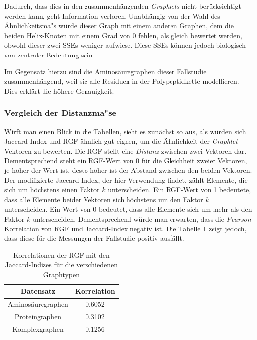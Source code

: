 \documentclass{report}
\begin{document}
Dadurch, dass dies in den zusammenh\"angenden \textit{Graphlets} nicht ber\"ucksichtigt werden kann, geht Information verloren. Unabh\"angig von der Wahl des \"Ahnlichkeitsma"s w\"urde dieser Graph mit einem anderen Graphen, dem die beiden Helix-Knoten mit einem Grad von 0 fehlen, als gleich bewertet werden, obwohl dieser zwei SSEs weniger aufwiese. Diese SSEs k\"onnen jedoch biologisch von zentraler Bedeutung sein.

Im Gegensatz hierzu sind die Aminos\"auregraphen dieser Fallstudie zusammenh\"angend, weil sie alle Residuen in der Polypeptidkette modellieren. Dies erkl\"art die h\"ohere Genauigkeit.


\subsubsection{Vergleich der Distanzma"se}

Wirft man einen Blick in die Tabellen, sieht es zun\"achst so aus, als w\"urden sich Jaccard-Index und RGF \"ahnlich gut eignen, um die \"Ahnlichkeit der \textit{Graphlet}-Vektoren zu bewerten. Die RGF stellt eine \emph{Distanz} zwischen zwei Vektoren dar. Dementsprechend steht ein RGF-Wert von 0 f\"ur die Gleichheit zweier Vektoren, je h\"oher der Wert ist, desto h\"oher ist der Abstand zwischen den beiden Vektoren. Der modifizierte Jaccard-Index, der hier Verwendung findet, z\"ahlt Elemente, die sich um h\"ochstens einen Faktor $k$ unterscheiden. Ein RGF-Wert von 1 bedeutete, dass alle Elemente beider Vektoren sich h\"ochstens um den Faktor $k$ unterscheiden. Ein Wert von 0 bedeutet, dass alle Elemente sich um mehr als den Faktor $k$ unterscheiden. Dementsprechend w\"urde man erwarten, dass die \textit{Pearson}-Korrelation von RGF und Jaccard-Index negativ ist. Die Tabelle \ref{tab:correlation} zeigt jedoch, dass diese f\"ur die Messungen der Fallstudie positiv ausf\"allt. 

\begin{table}
\begin{tabular}{ | c | c | }
\hline
Datensatz           & Korrelation \\ \hline
Aminos\"auregraphen &   0.6052    \\ \hline
Proteingraphen      &   0.3102    \\ \hline      
Komplexgraphen      &   0.1256    \\ \hline
\end{tabular}
\caption{Korrelationen der RGF mit den Jaccard-Indizes f\"ur die verschiedenen Graphtypen}
\label{tab:correlation}

\end{table}
\end{document}
